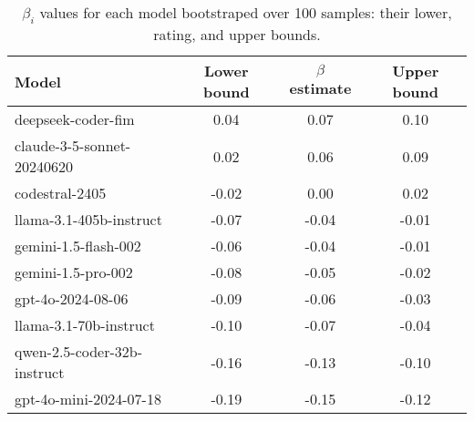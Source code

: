 \begin{table}[h!]
\centering
\caption{$\beta_i$ values for each model bootstraped over 100 samples: their lower, rating, and upper bounds.}
\begin{tabular}{lccc}
\hline
\textbf{Model} & \textbf{Lower bound} & \textbf{$\beta$ estimate} & \textbf{Upper bound} \\ \hline
deepseek-coder-fim         & 0.04  & 0.07  & 0.10  \\
claude-3-5-sonnet-20240620 & 0.02  & 0.06  & 0.09  \\
codestral-2405             & -0.02 & 0.00  & 0.02  \\
llama-3.1-405b-instruct    & -0.07 & -0.04 & -0.01 \\
gemini-1.5-flash-002       & -0.06 & -0.04 & -0.01 \\
gemini-1.5-pro-002         & -0.08 & -0.05 & -0.02 \\
gpt-4o-2024-08-06          & -0.09 & -0.06 & -0.03 \\
llama-3.1-70b-instruct     & -0.10 & -0.07 & -0.04 \\
qwen-2.5-coder-32b-instruct & -0.16 & -0.13 & -0.10 \\
gpt-4o-mini-2024-07-18     & -0.19 & -0.15 & -0.12 \\ \hline
\end{tabular}
\label{tab:beta_models}
\end{table}

